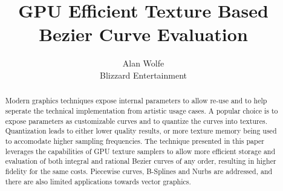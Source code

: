 \documentclass{jcgt}
\begin{document}
\usetikzlibrary{arrows.meta}

\title{GPU Efficient Texture Based Bezier Curve Evaluation}

\author
       {Alan Wolfe\\Blizzard Entertainment}


\maketitle
\thispagestyle{firstpagestyle}

\begin{abstract}
\small
Modern graphics techniques expose internal parameters to allow re-use and to help seperate the technical implementation from artistic usage cases.  A popular choice is to expose parameters as customizable curves and to quantize the curves into textures.  Quantization leads to either lower quality results, or more texture memory being used to accomodate higher sampling frequencies.  The technique presented in this paper leverages the capabilities of GPU texture samplers to allow more efficient storage and evaluation of both integral and rational Bezier curves of any order, resulting in higher fidelity for the same costs.  Piecewise curves, B-Splines and Nurbs are addressed, and there are also limited applications towards vector graphics.
\end{abstract}
\end{document}
